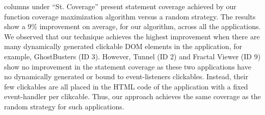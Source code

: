  columns under ``St. Coverage'' present \javascript statement coverage achieved by  our function coverage maximization algorithm versus a random strategy. The results show a 9\% improvement on average, for our algorithm, across all the applications. We observed that our technique achieves the highest improvement when there are many dynamically generated clickable DOM elements in the application, for example, GhostBusters (ID 3).
However, Tunnel (ID 2) and Fractal Viewer (ID 9) show no improvement in the statement coverage as these two applications have no dynamically generated or bound to event-listeners clickables. Instead, their few clickables are all placed in the HTML code of the application with a fixed event-handler per clikcable. Thus,  our approach achieves the same coverage as the random strategy for such applications. 

